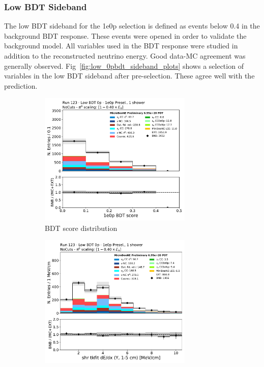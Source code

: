 \subsubsection{Low BDT Sideband}
\label{sec:sideband:1e0p:lowpid}
The low BDT sideband for the 1e0p selection is defined as events below 0.4 in the background BDT response. These events were opened in order to validate the background model. All variables used in the BDT response were studied in addition to the reconstructed neutrino energy. Good data-MC agreement  was generally observed. 
Fig~\ref{fig:low_0pbdt_sideband_plots} shows a selection of variables in the low BDT sideband after pre-selection.  These agree well with the prediction.  

\begin{figure}[H]
    \centering
    \begin{subfigure}{0.3\textwidth}
    \includegraphics[width=0.8\textwidth]{1e0p/Low_BDT_Sideband/bkg_score_low_bdt.pdf}
    \caption{BDT score distribution}
    \end{subfigure}
    \begin{subfigure}{0.3\textwidth}
    \includegraphics[width=0.8\textwidth]{1e0p/Low_BDT_Sideband/shr_tkfit_gap10_dedx_Y.pdf}

\end{subfigure}
\end{figure}
